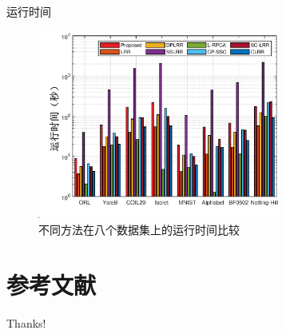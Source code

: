 \documentclass{beamer}
\begin{document}
\begin{frame}{运行时间}

\begin{figure}[htbp]
    \centering
    \includegraphics[width=8cm]{pic/7.eps}
    \caption{不同方法在八个数据集上的运行时间比较}
    \label{fig_time}
\end{figure}

\end{frame}



\section{参考文献}

\begin{frame}[allowframebreaks]
    \scriptsize
    
      
\end{frame}

\begin{frame}
    \begin{center}
        {\Huge\calligra Thanks!}
    \end{center}
\end{frame}
\end{document}
